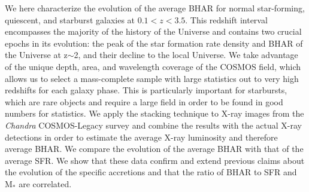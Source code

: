         We here characterize the evolution of the average BHAR for normal star-forming, quiescent, and starburst galaxies at $0.1<z<3.5$. This redshift interval encompasses the majority of the history of the Universe and contains two crucial epochs in its evolution: the peak of the star formation rate density and BHAR of the Universe at z$\sim$2, and their decline to the local Universe.
        We take advantage of the unique depth, area, and wavelength coverage of the COSMOS field, which allows us to select a mass-complete sample with large statistics out to very high redshifts for each galaxy phase. This is particularly important for starbursts, which are rare objects and require a large field in order to be found in good numbers for statistics. We apply the stacking technique to X-ray images from the \textit{Chandra} COSMOS-Legacy survey \citep{2016ApJ...819...62C} and combine the results with the actual X-ray detections in order to estimate the average X-ray luminosity and therefore average BHAR. We compare the evolution of the average BHAR with that of the average SFR. We show that these data confirm and extend previous claims about the evolution of the specific accretions and that the ratio of BHAR to SFR and M$_*$ are correlated. 
   

